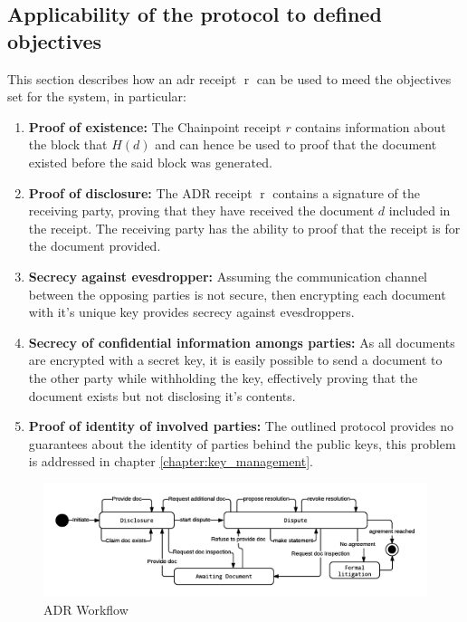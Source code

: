 \documentclass[12pt,msc,a4paper,oneside]{ucl_thesis}
\DeclareMathOperator{\adrreceipt}{r}
\begin{document}
\subsection{Applicability of the protocol to defined objectives}
This section describes how an adr receipt $\adrreceipt$ can be used to meed the objectives set for the system, in particular:
\begin{enumerate}
    \item{\textbf{Proof of existence:}} The Chainpoint receipt $r$ contains information about the block that $H(d)$ and can hence be used to proof that the document existed before the said block was generated.
    \item{\textbf{Proof of disclosure:}} The ADR receipt $\adrreceipt$ contains a signature of the receiving party, proving that they have received the document $d$ included in the receipt. The receiving party has the ability to proof that the receipt is for the document provided.
    \item{\textbf{Secrecy against evesdropper:}} Assuming the communication channel between the opposing parties is not secure, then encrypting each document with it's unique key provides secrecy against evesdroppers.
    \item{\textbf{Secrecy of confidential information amongs parties:}} As all documents are encrypted with a secret key, it is easily possible to send a document to the other party while withholding the key, effectively proving that the document exists but not disclosing it's contents.
    \item{\textbf{Proof of identity of involved parties:}} The outlined protocol provides no guarantees about the identity of parties behind the public keys, this problem is addressed in chapter \ref{chapter:key_management}.
\end{enumerate}

\begin{figure}
    \includegraphics[width=1.0\textwidth]{./figures/adr_workflow.png}
    \caption{ADR Workflow}
    \label{fig:adr_workflow}
\end{figure}
\end{document}
